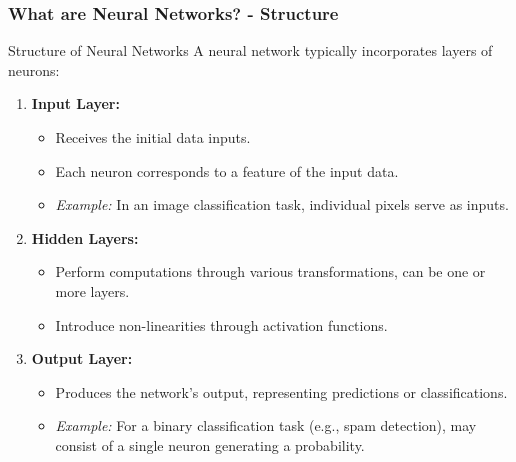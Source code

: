 \documentclass[aspectratio=169]{beamer}
\begin{document}
\begin{frame}[fragile]
    \frametitle{What are Neural Networks? - Structure}
    \begin{block}{Structure of Neural Networks}
        A neural network typically incorporates layers of neurons:
        \begin{enumerate}
            \item \textbf{Input Layer:}
                \begin{itemize}
                    \item Receives the initial data inputs.
                    \item Each neuron corresponds to a feature of the input data.
                    \item \textit{Example:} In an image classification task, individual pixels serve as inputs.
                \end{itemize}
                
            \item \textbf{Hidden Layers:}
                \begin{itemize}
                    \item Perform computations through various transformations, can be one or more layers.
                    \item Introduce non-linearities through activation functions.
                \end{itemize}
                
            \item \textbf{Output Layer:}
                \begin{itemize}
                    \item Produces the network's output, representing predictions or classifications.
                    \item \textit{Example:} For a binary classification task (e.g., spam detection), may consist of a single neuron generating a probability.
                \end{itemize}
        \end{enumerate}
    \end{block}
\end{frame}
\end{document}
